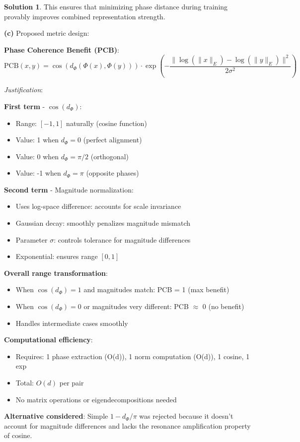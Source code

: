 \documentclass[12pt,a4paper]{book}
\theoremstyle{definition}
\newtheorem{solution}{Solution}[section]
\theoremstyle{remark}
\begin{document}
\begin{solution}
This ensures that minimizing phase distance during training provably improves combined representation strength.

\textbf{(c)} Proposed metric design:

\textbf{Phase Coherence Benefit (PCB)}:
$$\text{PCB}(x, y) = \cos\left(d_{\Phi}(\Phi(x), \Phi(y))\right) \cdot \exp\left(-\frac{\|\log(\|x\|_E) - \log(\|y\|_E)\|^2}{2\sigma^2}\right)$$

\textit{Justification}:

\textbf{First term} - $\cos(d_{\Phi})$:
\begin{itemize}
\item Range: $[-1, 1]$ naturally (cosine function)
\item Value: 1 when $d_{\Phi} = 0$ (perfect alignment)
\item Value: 0 when $d_{\Phi} = \pi/2$ (orthogonal)
\item Value: -1 when $d_{\Phi} = \pi$ (opposite phases)
\end{itemize}

\textbf{Second term} - Magnitude normalization:
\begin{itemize}
\item Uses log-space difference: accounts for scale invariance
\item Gaussian decay: smoothly penalizes magnitude mismatch
\item Parameter $\sigma$: controls tolerance for magnitude differences
\item Exponential: ensures range $[0, 1]$
\end{itemize}

\textbf{Overall range transformation}:
\begin{itemize}
\item When $\cos(d_{\Phi}) = 1$ and magnitudes match: PCB = 1 (max benefit)
\item When $\cos(d_{\Phi}) = 0$ or magnitudes very different: PCB $\approx$ 0 (no benefit)
\item Handles intermediate cases smoothly
\end{itemize}

\textbf{Computational efficiency}:
\begin{itemize}
\item Requires: 1 phase extraction (O(d)), 1 norm computation (O(d)), 1 cosine, 1 exp
\item Total: $O(d)$ per pair
\item No matrix operations or eigendecompositions needed
\end{itemize}

\textbf{Alternative considered}: Simple $1 - d_{\Phi}/\pi$ was rejected because it doesn't account for magnitude differences and lacks the resonance amplification property of cosine.
\end{solution}
\end{document}
